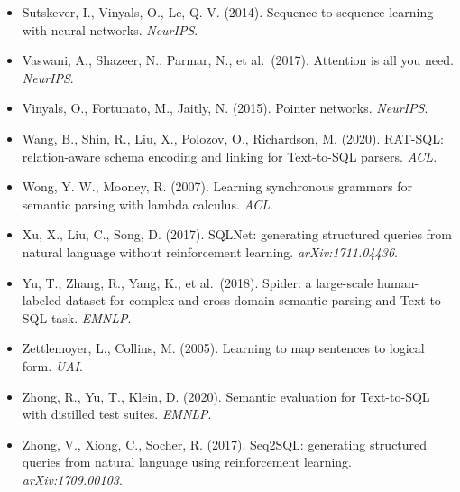 \documentclass[
  10pt,
]{article}
\begin{document}
\begin{itemize}
\item
  Sutskever, I., Vinyals, O., Le, Q. V. (2014). Sequence to sequence
  learning with neural networks. \emph{NeurIPS}.
\item
  Vaswani, A., Shazeer, N., Parmar, N., et al.~(2017). Attention is all
  you need. \emph{NeurIPS}.
\item
  Vinyals, O., Fortunato, M., Jaitly, N. (2015). Pointer networks.
  \emph{NeurIPS}.
\item
  Wang, B., Shin, R., Liu, X., Polozov, O., Richardson, M. (2020).
  RAT-SQL: relation-aware schema encoding and linking for Text-to-SQL
  parsers. \emph{ACL}.
\item
  Wong, Y. W., Mooney, R. (2007). Learning synchronous grammars for
  semantic parsing with lambda calculus. \emph{ACL}.
\item
  Xu, X., Liu, C., Song, D. (2017). SQLNet: generating structured
  queries from natural language without reinforcement learning.
  \emph{arXiv:1711.04436}.
\item
  Yu, T., Zhang, R., Yang, K., et al.~(2018). Spider: a large-scale
  human-labeled dataset for complex and cross-domain semantic parsing
  and Text-to-SQL task. \emph{EMNLP}.
\item
  Zettlemoyer, L., Collins, M. (2005). Learning to map sentences to
  logical form. \emph{UAI}.
\item
  Zhong, R., Yu, T., Klein, D. (2020). Semantic evaluation for
  Text-to-SQL with distilled test suites. \emph{EMNLP}.
\item
  Zhong, V., Xiong, C., Socher, R. (2017). Seq2SQL: generating
  structured queries from natural language using reinforcement learning.
  \emph{arXiv:1709.00103}.
\end{itemize}
\end{document}
